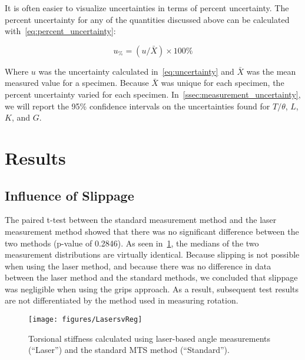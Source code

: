 It is often easier to visualize uncertainties in terms of percent uncertainty. The percent uncertainty for any of the quantities discussed above can be calculated with~\cref{eq:percent_uncertainty}:

\begin{equation}
	\label{eq:percent_uncertainty}
	u_{\%} = (u / \bar{X}) \times 100\%
\end{equation}

Where ${u}$ was the uncertainty calculated in~\cref{eq:uncertainty} and ${\bar{X}}$ was the mean measured value for a specimen. Because ${\bar{X}}$ was unique for each specimen, the percent uncertainty varied for each specimen. In~\cref{ssec:measurement_uncertainty}, we will report the 95\% confidence intervals on the uncertainties found for ${T/\theta}$, ${L}$, ${K}$, and ${G}$.

\section{Results}
\label{sec:ch3_results}

\subsection{Influence of Slippage}
\label{ssec:influence_of_slippage}
The paired t-test between the standard measurement method and the laser measurement method showed that there was no significant difference between the two methods (p-value of 0.2846). As seen in~\cref{fig:LasersvReg}, the medians of the two measurement distributions are virtually identical. Because slipping is not possible when using the laser method, and because there was no difference in data between the laser method and the standard methods, we concluded that slippage was negligible when using the grips approach. As a result, subsequent test results are not differentiated by the method used in measuring rotation.

\begin{figure}[htbp]
	\centering
	\texttt{[image: figures/LasersvReg]}
	\caption[Torsional stiffness calculated using laser-based angle measurements and the standard MTS method.]{Torsional stiffness calculated using laser-based angle measurements (“Laser”) and the standard MTS method (“Standard”). }
	\label{fig:LasersvReg}
\end{figure}

\hfill \break

